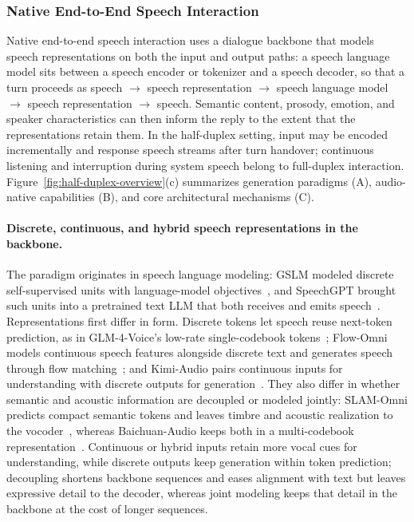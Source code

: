 \subsubsection{Native End-to-End Speech Interaction}
\label{sec:native-end-to-end-speech-interaction}
Native end-to-end speech interaction uses a dialogue backbone that models speech representations on both the input and output paths: a speech language model sits between a speech encoder or tokenizer and a speech decoder, so that a turn proceeds as speech $\rightarrow$ speech representation $\rightarrow$ speech language model $\rightarrow$ speech representation $\rightarrow$ speech. Semantic content, prosody, emotion, and speaker characteristics can then inform the reply to the extent that the representations retain them. In the half-duplex setting, input may be encoded incrementally and response speech streams after turn handover; continuous listening and interruption during system speech belong to full-duplex interaction. Figure~\ref{fig:half-duplex-overview}(c) summarizes generation paradigms (A), audio-native capabilities (B), and core architectural mechanisms (C).

\paragraph{Discrete, continuous, and hybrid speech representations in the backbone.}
The paradigm originates in speech language modeling: GSLM modeled discrete self-supervised units with language-model objectives~\citep{lakhotia2021gslm}, and SpeechGPT brought such units into a pretrained text LLM that both receives and emits speech~\citep{DBLP:conf/emnlp/ZhangLZZWZQ23}. Representations first differ in form. Discrete tokens let speech reuse next-token prediction, as in GLM-4-Voice's low-rate single-codebook tokens~\citep{DBLP:journals/corr/abs-2412-02612}; Flow-Omni models continuous speech features alongside discrete text and generates speech through flow matching~\citep{DBLP:journals/corr/abs-2412-04917}; and Kimi-Audio pairs continuous inputs for understanding with discrete outputs for generation~\citep{DBLP:journals/corr/abs-2504-18425}. They also differ in whether semantic and acoustic information are decoupled or modeled jointly: SLAM-Omni predicts compact semantic tokens and leaves timbre and acoustic realization to the vocoder~\citep{DBLP:conf/acl/Chen0YLLXN00L0025}, whereas Baichuan-Audio keeps both in a multi-codebook representation~\citep{DBLP:journals/corr/abs-2502-17239}. Continuous or hybrid inputs retain more vocal cues for understanding, while discrete outputs keep generation within token prediction; decoupling shortens backbone sequences and eases alignment with text but leaves expressive detail to the decoder, whereas joint modeling keeps that detail in the backbone at the cost of longer sequences.

